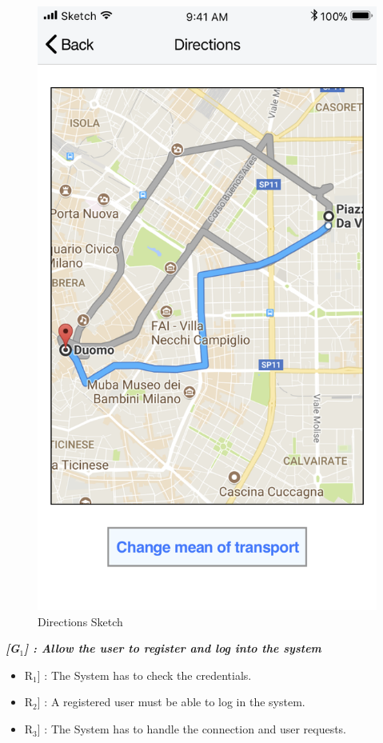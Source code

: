 \begin{enumerate}
\begin{figure}[H]
				\centering
				\includegraphics[scale=0.25]{Images/Sketch/Directions}
				\caption{Directions Sketch}
			\end{figure}
\end{enumerate}

\vspace{0.5cm}
\noindent
\emph{\textbf{[G$_{1}$] : Allow the user to register and log into the system}}
\begin{itemize}
	\setlength{\leftskip}{0.5cm}
	\item \lbrack R$_{1}$] : The System has to check the credentials.
	\item \lbrack R$_{2}$] : A registered user must be able to log in the system.
	\item \lbrack R$_{3}$] : The System has to handle the connection and user requests.
\end{itemize}

